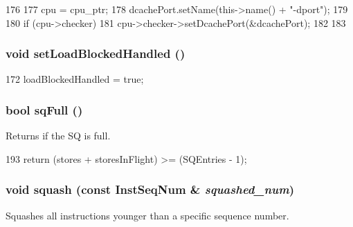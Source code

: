 \begin{DoxyCode}
176 {
177     cpu = cpu_ptr;
178     dcachePort.setName(this->name() + "-dport");
179 
180     if (cpu->checker) {
181         cpu->checker->setDcachePort(&dcachePort);
182     }
183 }
\end{DoxyCode}
\hypertarget{classOzoneLWLSQ_ac8bfb1e163f7ba2261d702623226973d}{
\subsubsection[{setLoadBlockedHandled}]{\setlength{\rightskip}{0pt plus 5cm}void setLoadBlockedHandled ()}}
\label{classOzoneLWLSQ_ac8bfb1e163f7ba2261d702623226973d}



\begin{DoxyCode}
172     { loadBlockedHandled = true; }
\end{DoxyCode}
\hypertarget{classOzoneLWLSQ_a477981d1f905d2d398a1527f7149e3c4}{
\subsubsection[{sqFull}]{\setlength{\rightskip}{0pt plus 5cm}bool sqFull ()}}
\label{classOzoneLWLSQ_a477981d1f905d2d398a1527f7149e3c4}
Returns if the SQ is full. 


\begin{DoxyCode}
193 { return (stores + storesInFlight) >= (SQEntries - 1); }
\end{DoxyCode}
\hypertarget{classOzoneLWLSQ_a51dd7e304d5413447717826fac6f4921}{
\subsubsection[{squash}]{\setlength{\rightskip}{0pt plus 5cm}void squash (const {\bf InstSeqNum} \& {\em squashed\_\-num})}}
\label{classOzoneLWLSQ_a51dd7e304d5413447717826fac6f4921}
Squashes all instructions younger than a specific sequence number. 


